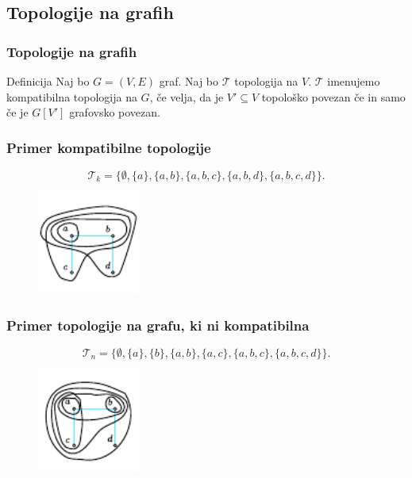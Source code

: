 \documentclass{beamer}
\begin{document}
\subsection{Topologije na grafih}
\begin{frame}[t]
    \frametitle{Topologije na grafih}
    \begin{block}{Definicija}
        Naj bo $G = (V,E)$ graf. Naj bo $\mathcal{T}$ topologija na $V$. $\mathcal{T}$ imenujemo \alert{kompatibilna
        topologija} na $G$, če velja, da je
        $V' \subseteq V$ topološko povezan če in samo če je $G[V']$ grafovsko povezan.
    \end{block}
\end{frame}
\begin{frame}[t]
    \frametitle{Primer kompatibilne topologije}
    \[\mathcal{T}_k = \{\emptyset, \{a\}, \{a, b\}, \{a, b, c\}, \{a, b, d\}, \{a, b, c, d\}\}.\]
    \begin{figure}[h]
        \begin{center}
        \includegraphics[width=0.3\textwidth]{compatible-topology.pdf}
        \end{center}
    \end{figure}
\end{frame}
\begin{frame}[t]
    \frametitle{Primer topologije na grafu, ki ni kompatibilna}
    \[\mathcal{T}_n = \{\emptyset, \{a\}, \{b\}, \{a, b\}, \{a, c\}, \{a, b, c\}, \{a, b, c, d\}\}.\]
    \begin{figure}[h]
        \begin{center}
        \includegraphics[width=0.3\textwidth]{incompatible-topology.pdf}
        \end{center}
    \end{figure}
\end{frame}
\end{document}
